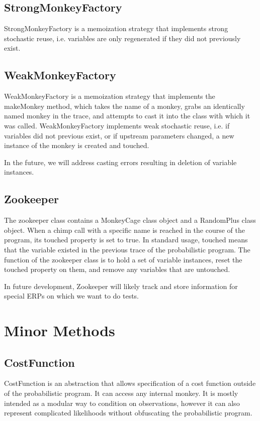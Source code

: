 \subsection{StrongMonkeyFactory}
StrongMonkeyFactory is a memoization strategy that implements strong stochastic reuse, i.e. variables are only regenerated if they did not previously exist.

\subsection{WeakMonkeyFactory}
WeakMonkeyFactory is a memoization strategy that implements the makeMonkey method, which takes the name of a monkey, grabs an identically named monkey in the trace, and attempts to cast it into the class with which it was called. WeakMonkeyFactory implements weak stochastic reuse, i.e. if variables did not previous exist, or if upstream parameters changed, a new instance of the monkey is created and touched. 

In the future, we will address casting errors resulting in deletion of variable instances.

\subsection{Zookeeper}
The zookeeper class contains a MonkeyCage class object and a RandomPlus class object. When a chimp call with a specific name is reached in the course of the program, its touched property is set to true. In standard usage, touched means that the variable existed in the previous trace of the probabilistic program. The function of the zookeeper class is to hold a set of variable instances, reset the touched property on them, and remove any variables that are untouched. 

In future development, Zookeeper will likely track and store information for special ERPs on which we want to do tests.

\section{Minor Methods}

\subsection{CostFunction}
CostFunction is an abstraction that allows specification of a cost function outside of the probabilistic program. It can access any internal monkey. It is mostly intended as a modular way to condition on observations, however it can also represent complicated likelihoods without obfuscating the probabilistic program.


